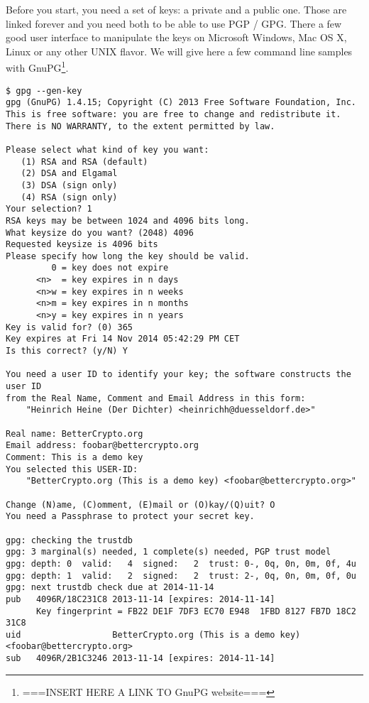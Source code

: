 Before you start, you need a set of keys: a private and a public one.  Those are linked forever and you need both to be able to use PGP / GPG.
There a few good user interface to manipulate the keys on Microsoft Windows, Mac OS X, Linux or any other UNIX flavor.  We will give here a few command line samples with GnuPG\footnote{===INSERT HERE A LINK TO GnuPG website===}.

\begin{verbatim}
$ gpg --gen-key
gpg (GnuPG) 1.4.15; Copyright (C) 2013 Free Software Foundation, Inc.
This is free software: you are free to change and redistribute it.
There is NO WARRANTY, to the extent permitted by law.

Please select what kind of key you want:
   (1) RSA and RSA (default)
   (2) DSA and Elgamal
   (3) DSA (sign only)
   (4) RSA (sign only)
Your selection? 1
RSA keys may be between 1024 and 4096 bits long.
What keysize do you want? (2048) 4096
Requested keysize is 4096 bits
Please specify how long the key should be valid.
         0 = key does not expire
      <n>  = key expires in n days
      <n>w = key expires in n weeks
      <n>m = key expires in n months
      <n>y = key expires in n years
Key is valid for? (0) 365
Key expires at Fri 14 Nov 2014 05:42:29 PM CET
Is this correct? (y/N) Y

You need a user ID to identify your key; the software constructs the user ID
from the Real Name, Comment and Email Address in this form:
    "Heinrich Heine (Der Dichter) <heinrichh@duesseldorf.de>"

Real name: BetterCrypto.org
Email address: foobar@bettercrypto.org
Comment: This is a demo key
You selected this USER-ID:
    "BetterCrypto.org (This is a demo key) <foobar@bettercrypto.org>"

Change (N)ame, (C)omment, (E)mail or (O)kay/(Q)uit? O
You need a Passphrase to protect your secret key.

gpg: checking the trustdb
gpg: 3 marginal(s) needed, 1 complete(s) needed, PGP trust model
gpg: depth: 0  valid:   4  signed:   2  trust: 0-, 0q, 0n, 0m, 0f, 4u
gpg: depth: 1  valid:   2  signed:   2  trust: 2-, 0q, 0n, 0m, 0f, 0u
gpg: next trustdb check due at 2014-11-14
pub   4096R/18C231C8 2013-11-14 [expires: 2014-11-14]
      Key fingerprint = FB22 DE1F 7DF3 EC70 E948  1FBD 8127 FB7D 18C2 31C8
uid                  BetterCrypto.org (This is a demo key) <foobar@bettercrypto.org>
sub   4096R/2B1C3246 2013-11-14 [expires: 2014-11-14]
\end{verbatim}

